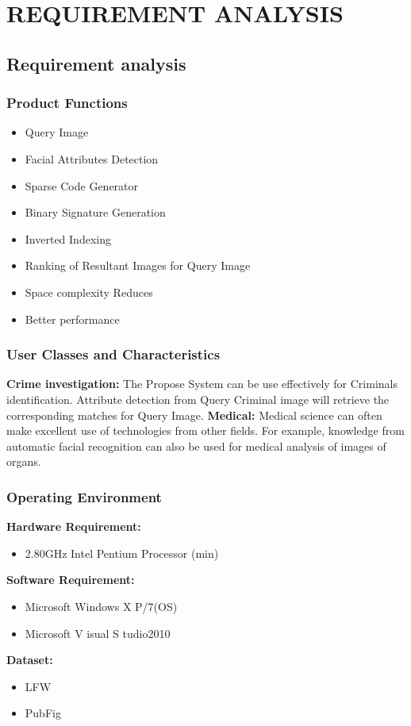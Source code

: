 
\chapter{REQUIREMENT ANALYSIS}

\section{\normalsize{\textbf{Requirement analysis}}} 
\subsection{\normalsize{Product Functions}}
\begin{itemize}
\item Query Image
\item Facial Attributes Detection
\item Sparse Code Generator
\item Binary Signature Generation
\item Inverted Indexing
\item Ranking of Resultant Images for Query Image
\item Space complexity Reduces
\item Better performance
\end{itemize}
\subsection{\normalsize{User Classes and Characteristics}}
\textbf{Crime investigation:} 
The Propose System can be use effectively for Criminals identification. Attribute detection from Query Criminal image will retrieve the corresponding matches for Query Image.
\newline \textbf{Medical:}
Medical science can often make excellent use of technologies from other fields. For example, knowledge from automatic facial recognition can also be used for medical analysis of images of organs.
\subsection{\normalsize{Operating Environment}}
\textbf{Hardware Requirement:}
\begin{itemize}
\item 2.80GHz Intel Pentium Processor (min)
\end{itemize}
\textbf{Software Requirement:}
\begin{itemize}
\item Microsoft Windows X P/7(OS)
\item Microsoft V isual S tudio2010
\end{itemize}
\textbf{Dataset:}
\begin{itemize}
\item LFW
\item PubFig
\end{itemize}
